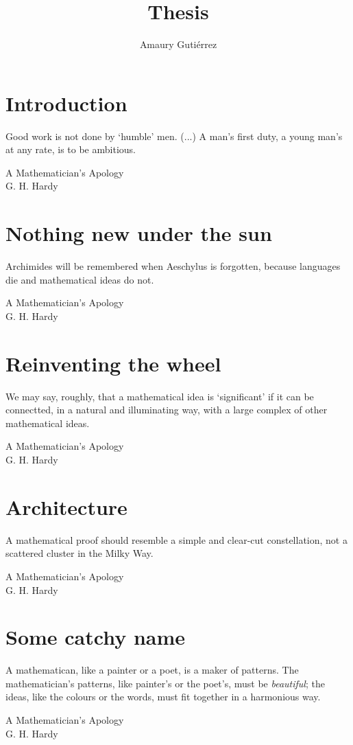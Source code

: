 \documentclass[12pt,letterpaper]{book}
\author{Amaury Guti\'errez}
\title{Thesis}
\theoremstyle{definition} \newtheorem{definition}{Definición}[section]
\theoremstyle{plain} \newtheorem{theorem}{Teorema}[section]
\theoremstyle{plain} \newtheorem{lemma}{Lema}[section]
\theoremstyle{plain} \newtheorem{proposition}[theorem]{Proposici\'on}
\theoremstyle{plain} \newtheorem{corollary}[theorem]{Corolario}
\theoremstyle{plain} \newtheorem{remark}[theorem]{Comentario}
\begin{document}
\frontmatter
 



\tableofcontents

\mainmatter
\chapter{Introduction}
\epigraph{Good work is not done by `humble' men. (...) A man's first duty, a young man's at any rate, is to be ambitious.}{A Mathematician's Apology \\ G. H. Hardy}


\chapter{Nothing new under the sun}
\epigraph{Archimides will be remembered when Aeschylus is forgotten, because languages die and mathematical ideas do not.}{A Mathematician's Apology \\ G. H. Hardy}


\chapter{Reinventing the wheel}
\epigraph{We may say, roughly, that a mathematical idea is `significant' if it can be connectted, in a natural and illuminating way, with a large complex of other mathematical ideas.}{A Mathematician's Apology \\ G. H. Hardy}


\chapter{Architecture}
\epigraph{A mathematical proof should resemble a simple and clear-cut constellation, not a scattered cluster in the Milky Way.}{A Mathematician's Apology \\ G. H. Hardy}


\chapter{Some catchy name}
\epigraph{A mathematican, like a painter or a poet, is a maker of patterns. The mathematician's patterns, like painter's or the poet's, must be \emph{beautiful}; the ideas, like the colours or the words, must fit together in a harmonious way.}{A Mathematician's Apology \\ G. H. Hardy}

\end{document}
